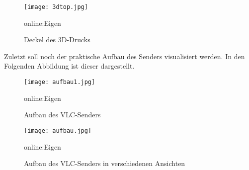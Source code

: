 \begin{figure}[h]
	\centering
	\texttt{[image: 3dtop.jpg]}
	\caption[Deckel des 3D-Drucks]{Deckel des 3D-Drucks} \gls{online:Eigen}
	\label{fig:3dtop}
\end{figure}

Zuletzt soll noch der praktische Aufbau des Senders visualisiert werden. In den Folgenden Abbildung ist dieser dargestellt. 

\begin{figure}[h]
	\centering
	\texttt{[image: aufbau1.jpg]}
	\caption[Aufbau des VLC-Senders]{Aufbau des VLC-Senders} \gls{online:Eigen}
	\label{fig:aufbau2}
\end{figure}


\begin{figure}[h]
	\centering
	\texttt{[image: aufbau.jpg]}
	\caption[Aufbau des VLC-Senders in verschiedenen Ansichten]{Aufbau des VLC-Senders in verschiedenen Ansichten} \gls{online:Eigen}
	\label{fig:aufbau1}
\end{figure}

